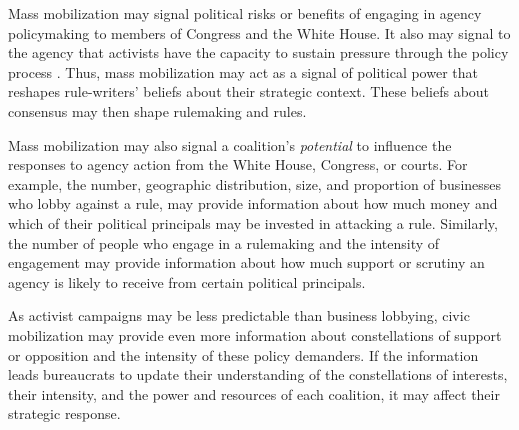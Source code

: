 
Mass mobilization may signal political risks or benefits of engaging in agency policymaking to members of Congress and the White House. It also may signal to the agency that activists have the capacity to sustain pressure through the policy process \citep{Coglianese2001}. %
Thus, mass mobilization may act as a signal of political power that reshapes rule-writers' beliefs about their strategic context. These beliefs about consensus may then shape rulemaking and rules.


Mass mobilization may also signal a coalition's \textit{potential} to influence the responses to agency action from the White House, Congress, or courts. 
For example, the number, geographic distribution, size, and proportion of businesses who lobby against a rule, may provide information about how much money and which of their political principals may be invested in attacking a rule. Similarly, the number of people who engage in a rulemaking and the intensity of engagement may provide information about how much support or scrutiny an agency is likely to receive from certain political principals. 

As activist campaigns may be less predictable than business lobbying, civic mobilization may provide even more information about constellations of support or opposition and the intensity of these policy demanders. 
If the information leads bureaucrats to update their understanding of the constellations of interests, their intensity, and the power and resources of each coalition, it may affect their strategic response.

